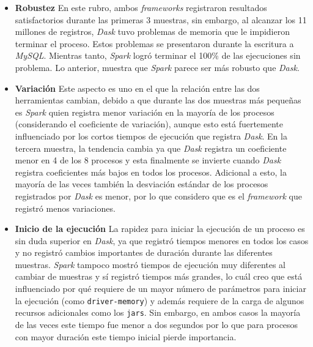 \begin{itemize}
	
	\item \textbf{Robustez} En este rubro, ambos \textit{frameworks} registraron resultados satisfactorios durante las primeras 3 muestras, sin embargo, al alcanzar los 11 millones de registros, \textit{Dask} tuvo problemas de memoria que le impidieron terminar el proceso. Estos problemas se presentaron durante la escritura a \textit{MySQL}. Mientras tanto, \textit{Spark} logró terminar el 100\% de las ejecuciones sin problema. Lo anterior, muestra que \textit{Spark} parece ser más robusto que \textit{Dask}.
	
	\item \textbf{Variación} Este aspecto es uno en el que la relación entre las dos herramientas cambian, debido a que durante las dos muestras más pequeñas es \textit{Spark} quien registra menor variación en la mayoría de los procesos (considerando el coeficiente de variación), aunque esto está fuertemente influenciado por los cortos tiempos de ejecución que registra \textit{Dask}. En la tercera muestra, la tendencia cambia ya que \textit{Dask} registra un coeficiente menor en 4 de los 8 procesos y esta finalmente se invierte cuando \textit{Dask} registra coeficientes más bajos en todos los procesos. Adicional a esto, la mayoría de las veces también la desviación estándar de los procesos registrados por \textit{Dask} es menor, por lo que considero que es el \textit{framework} que registró menos variaciones.
	
	\item \textbf{Inicio de la ejecución} La rapidez para iniciar la ejecución de un proceso es sin duda superior en \textit{Dask}, ya que registró tiempos menores en todos los casos y no registró cambios importantes de duración durante las diferentes muestras. \textit{Spark} tampoco mostró tiempos de ejecución muy diferentes al cambiar de muestras y sí registró tiempos más grandes, lo cuál creo que está influenciado por qué requiere de un mayor número de parámetros para iniciar la ejecución (como \texttt{driver-memory}) y además requiere de la carga de algunos recursos adicionales como los \texttt{jars}. Sin embargo, en ambos casos la mayoría de las veces este tiempo fue menor a dos segundos por lo que para procesos con mayor duración este tiempo inicial pierde importancia.
	

\end{itemize}
